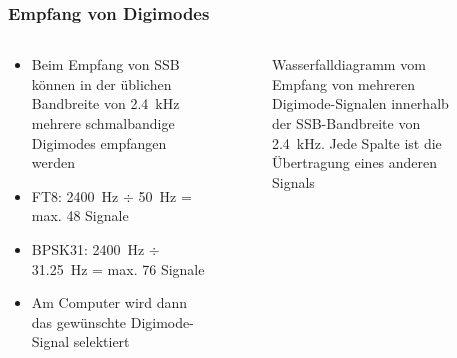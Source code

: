 \begin{frame}
\frametitle{Empfang von Digimodes}
\begin{columns}
    \begin{column}{0.48\textwidth}
    \begin{itemize}
  \item Beim Empfang von SSB können in der üblichen Bandbreite von \qty{2,4}{\kilo\hertz} mehrere schmalbandige Digimodes empfangen werden
  \item FT8: \qty{2400}{\hertz}  $\div$  \qty{50}{\hertz} = max. 48 Signale
  \item BPSK31: \qty{2400}{\hertz}  $\div$  \qty{31,25}{\hertz} = max. 76 Signale
  \item Am Computer wird dann das gewünschte Digimode-Signal selektiert
  \end{itemize}

    \end{column}
   \begin{column}{0.48\textwidth}
       
\begin{figure}
    \caption{\scriptsize Wasserfalldiagramm vom Empfang von mehreren Digimode-Signalen innerhalb der SSB-Bandbreite von \qty{2,4}{\kilo\hertz}. Jede Spalte ist die Übertragung eines anderen Signals}
    \label{e_digimode_ssb_ft8_wasserfall}
\end{figure}


   \end{column}
\end{columns}

\end{frame}


